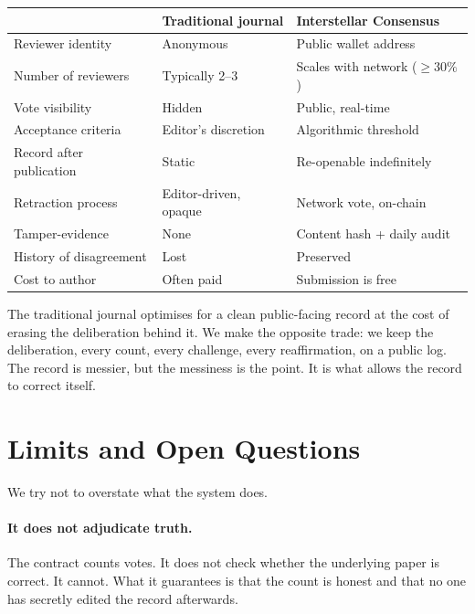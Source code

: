 \documentclass[11pt,a4paper]{article}
\begin{document}
\begin{plainbox}
\begin{tabular}{@{}p{4.2cm} p{4.9cm} p{5.1cm}@{}}
                           & \textbf{Traditional journal}                & \textbf{Interstellar Consensus} \\
\midrule
Reviewer identity          & Anonymous                                   & Public wallet address \\
Number of reviewers        & Typically 2--3                              & Scales with network ($\geq 30\%$) \\
Vote visibility            & Hidden                                      & Public, real-time \\
Acceptance criteria        & Editor's discretion                         & Algorithmic threshold \\
Record after publication   & Static                                      & Re-openable indefinitely \\
Retraction process         & Editor-driven, opaque                       & Network vote, on-chain \\
Tamper-evidence            & None                                        & Content hash + daily audit \\
History of disagreement    & Lost                                        & Preserved \\
Cost to author             & Often paid                                  & Submission is free \\
\end{tabular}
\end{plainbox}

The traditional journal optimises for a clean public-facing record
at the cost of erasing the deliberation behind it. We make the
opposite trade: we keep the deliberation, every count, every
challenge, every reaffirmation, on a public log. The record is
messier, but the messiness is the point. It is what allows the
record to correct itself.

\section{Limits and Open Questions}

We try not to overstate what the system does.

\paragraph{It does not adjudicate truth.} The contract counts votes.
It does not check whether the underlying paper is correct. It cannot.
What it guarantees is that the count is honest and that no one has
secretly edited the record afterwards.
\end{document}
